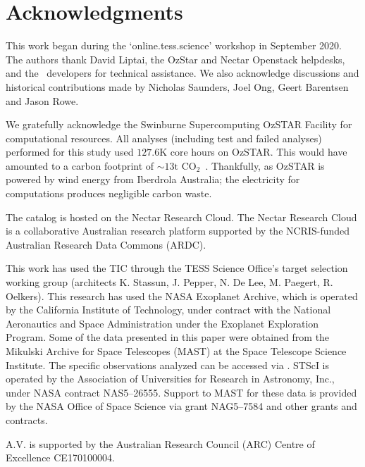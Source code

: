 \documentclass[floatfix,ApJL,twocolumn]{aastex631}
\begin{document}



\section*{Acknowledgments}{

This work began during the `online.tess.science' workshop in September 2020. 
The authors thank David Liptai, the OzStar and Nectar Openstack helpdesks, and the \lightkurve\ developers for technical assistance. We also acknowledge discussions and historical contributions made by Nicholas Saunders, Joel Ong, Geert Barentsen and Jason Rowe.

We gratefully acknowledge the Swinburne Supercomputing OzSTAR Facility for computational resources. All analyses (including test and failed analyses) performed for this study used $127.6$K core hours on OzSTAR. This would have amounted to a carbon footprint of ${\sim13{\text{t CO}_2}}$~\citep{greenhouse, energy_to_co2_converter}. Thankfully, as OzSTAR is powered by wind energy from Iberdrola Australia; the electricity for computations produces negligible carbon waste. 

The catalog is hosted on the Nectar Research Cloud. The Nectar Research Cloud is a collaborative Australian research platform supported by the NCRIS-funded Australian Research Data Commons (ARDC).

This work has used the TIC through the TESS Science Office’s target selection working group (architects K. Stassun, J. Pepper, N. De Lee, M. Paegert, R. Oelkers). This research has used the NASA Exoplanet Archive, which is operated by the California Institute of Technology, under contract with the National Aeronautics and Space Administration under the Exoplanet Exploration Program. Some of the data presented in this paper were obtained from the Mikulski Archive for Space Telescopes (MAST) at the Space Telescope Science Institute. The specific observations analyzed can be accessed via \mastDatabase. STScI is operated by the Association of Universities for Research in Astronomy, Inc., under NASA contract NAS5–26555. Support to MAST for these data is provided by the NASA Office of Space Science via grant NAG5–7584 and other grants and contracts.

A.V. is supported by the Australian Research Council (ARC) Centre of Excellence CE170100004.
}

\vspace{5mm}
\end{document}
